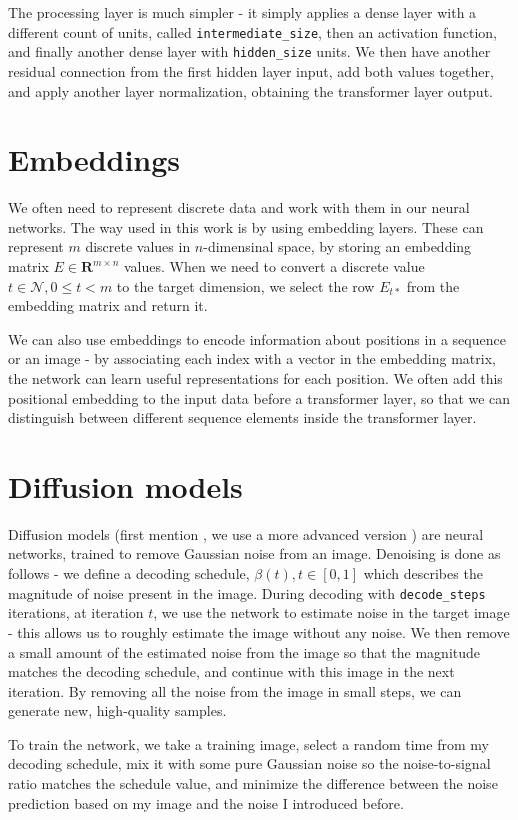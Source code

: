 The processing layer is much simpler - it simply applies a dense layer with a different count of units, called \texttt{intermediate\_size}, then an activation function, and finally another dense layer with \texttt{hidden\_size} units. We then have another residual connection from the first hidden layer input, add both values together, and apply another layer normalization, obtaining the transformer layer output.




\section{Embeddings}

We often need to represent discrete data and work with them in our neural networks. The way used in this work is by using embedding layers. These can represent $m$ discrete values in $n$-dimensinal space, by storing an embedding matrix $E \in \mathbf{R}^{m \times n}$ values. When we need to convert a discrete value $t \in \mathcal{N}, 0 \leq t < m$ to the target dimension, we select the row $E_{t*}$ from the embedding matrix and return it.

We can also use embeddings to encode information about positions in a sequence or an image - by associating each index with a vector in the embedding matrix, the network can learn useful representations for each position. We often add this positional embedding to the input data before a transformer layer, so that we can distinguish between different sequence elements inside the transformer layer.


\section{Diffusion models}

Diffusion models (first mention \citep{diffusion_model_ddpm}, we use a more advanced version \citep{diffusion_model_ddim}) are neural networks, trained to remove Gaussian noise from an image. Denoising is done as follows - we define a decoding schedule, $\beta(t), t \in [0, 1]$ which describes the magnitude of noise present in the image. During decoding with \texttt{decode\_steps} iterations, at iteration $t$, we use the network to estimate noise in the target image - this allows us to roughly estimate the image without any noise. We then remove a small amount of the estimated noise from the image so that the magnitude matches the decoding schedule, and continue with this image in the next iteration. By removing all the noise from the image in small steps, we can generate new, high-quality samples. 

To train the network, we take a training image, select a random time from my decoding schedule, mix it with some pure Gaussian noise so the noise-to-signal ratio matches the schedule value, and minimize the difference between the noise prediction based on my image and the noise I introduced before.
